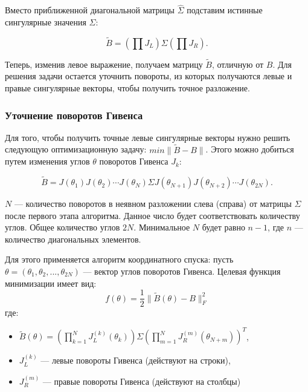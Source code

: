 Вместо приближенной диагональной матрицы \( \widehat{\Sigma} \) подставим истинные сингулярные значения \( \Sigma \):

\begin{equation}
\tilde{B} = \left( \prod J_L \right) \Sigma \left( \prod J_R \right).
\end{equation}

Теперь, изменив левое выражение, получаем матрицу $\tilde{B}$, отличную от $B$. Для решения задачи остается уточнить повороты, из которых получаются левые и правые сингулярные векторы, чтобы получить точное разложение.

\subsubsection{Уточнение поворотов Гивенса}

Для того, чтобы получить точные левые сингулярные векторы нужно решить следующую оптимизационную задачу: \(min\| \tilde{B} - B \|\). Этого можно добиться путем изменения углов \( \theta \) поворотов Гивенса \( J_k \):

\begin{equation} \label{b_hat}
\tilde{B} = J(\theta_1) J(\theta_2) \cdots J(\theta_N) \Sigma J(\theta_{N+1}) J(\theta_{N+2}) \cdots J(\theta_{2N}).
\end{equation}
\begin{note}
    $N$ — количество поворотов в неявном разложении слева (справа) от матрицы $\Sigma$ после первого этапа алгоритма. Данное число будет соответствовать количеству углов. Общее количество углов $2N$. Минимальное $N$ будет равно $n-1$, где $n$ — количество диагональных элементов.
\end{note}
Для этого применяется алгоритм координатного спуска: пусть $\theta = (\theta_1, \theta_2, ..., \theta_{2N})$ — вектор углов поворотов Гивенса. 
Целевая функция минимизации имеет вид:
\begin{equation}
f(\theta) = \frac{1}{2} \| \tilde{B}(\theta) - B \|_F^2
\end{equation}
где: 

\begin{itemize}
\item $\tilde{B}(\theta) = \left( \prod_{k=1}^N J_L^{(k)}(\theta_k) \right) \Sigma \left( \prod_{m=1}^N J_R^{(m)}(\theta_{N+m}) \right)^T$, 
\item $J_L^{(k)}$ — левые повороты Гивенса (действуют на строки), 
\item $J_R^{(m)}$ — правые повороты Гивенса (действуют на столбцы)
\end{itemize}

